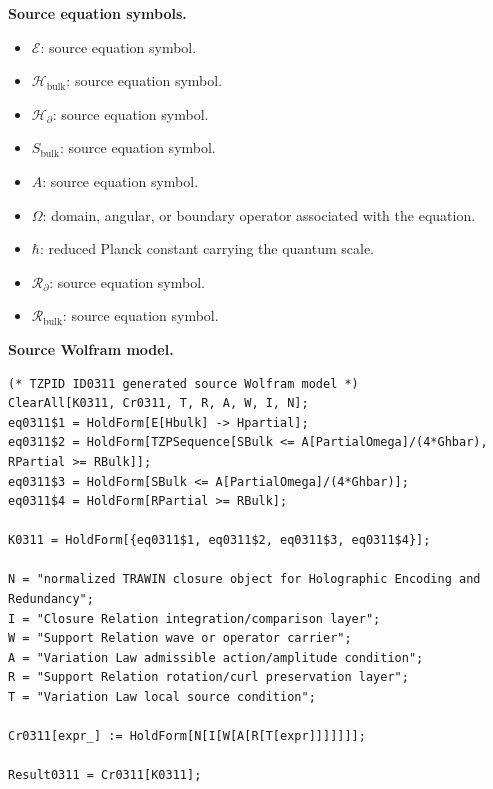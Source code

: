 \begin{minipage}[t]{0.49\linewidth}
\begingroup
\small
\raggedright
\textbf{Source equation symbols.}\par
\begin{itemize}[leftmargin=1.35em,itemsep=1pt,topsep=1pt,parsep=0pt]
    \item $\mathcal{E}$: source equation symbol.
    \item $\mathcal{H}_{\mathrm{bulk}}$: source equation symbol.
    \item $\mathcal{H}_{\partial}$: source equation symbol.
    \item $S_{\mathrm{bulk}}$: source equation symbol.
    \item $A$: source equation symbol.
    \item $\Omega$: domain, angular, or boundary operator associated with the equation.
    \item $\hbar$: reduced Planck constant carrying the quantum scale.
    \item $\mathcal{R}_{\partial}$: source equation symbol.
    \item $\mathcal{R}_{\mathrm{bulk}}$: source equation symbol.
\end{itemize}
\endgroup
\end{minipage}\hfill
\begin{minipage}[t]{0.47\linewidth}
\begingroup
\scriptsize
\raggedright
\textbf{Source Wolfram model.}\par
\begin{Verbatim}[fontsize=\tiny,breaklines=true,breakanywhere=true]
(* TZPID ID0311 generated source Wolfram model *)
ClearAll[K0311, Cr0311, T, R, A, W, I, N];
eq0311$1 = HoldForm[E[Hbulk] -> Hpartial];
eq0311$2 = HoldForm[TZPSequence[SBulk <= A[PartialOmega]/(4*Ghbar), RPartial >= RBulk]];
eq0311$3 = HoldForm[SBulk <= A[PartialOmega]/(4*Ghbar)];
eq0311$4 = HoldForm[RPartial >= RBulk];

K0311 = HoldForm[{eq0311$1, eq0311$2, eq0311$3, eq0311$4}];

N = "normalized TRAWIN closure object for Holographic Encoding and Redundancy";
I = "Closure Relation integration/comparison layer";
W = "Support Relation wave or operator carrier";
A = "Variation Law admissible action/amplitude condition";
R = "Support Relation rotation/curl preservation layer";
T = "Variation Law local source condition";

Cr0311[expr_] := HoldForm[N[I[W[A[R[T[expr]]]]]]];

Result0311 = Cr0311[K0311];
\end{Verbatim}
\endgroup
\end{minipage}

